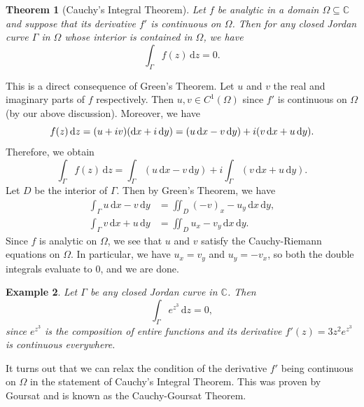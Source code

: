 \documentclass[10pt]{article}
\makeatletter
\newcommand{\C}{\mathbb{C}}
\newcommand{\dd}{\,\mathrm{d}}
\theoremstyle{newstyle}
\newtheorem{thm}{Theorem}[section]
\newtheorem{exmp}[thm]{Example}
\newenvironment{pf}[1][\proofname]{\par
  \pushQED{\qed}%
  \normalfont \topsep0\p@\relax
  \trivlist
  \item[\hskip\labelsep\scshape
  #1\@addpunct{.}]\ignorespaces
}{%
  \popQED\endtrivlist\@endpefalse
}
\makeatother
\begin{document}
\begin{thm}[Cauchy's Integral Theorem]
Let $f$ be analytic in a domain $\Omega \subseteq \C$ and suppose that 
its derivative $f'$ is continuous on $\Omega$. Then for any closed Jordan curve $\Gamma$ 
in $\Omega$ whose interior is contained in $\Omega$, we have 
\[ \int_\Gamma f(z)\dd z = 0. \]
\end{thm}
\begin{pf}
This is a direct consequence of Green's Theorem. Let $u$ and $v$ the real and imaginary parts of 
$f$ respectively. Then $u, v \in C^1(\Omega)$ since $f'$ is continuous on 
$\Omega$ (by our above discussion). Moreover, we have 
\[ f(z)\dd z = (u+iv)({\rm d}x + i\dd y) = (u\dd x - v\dd y) + i(v\dd x + u\dd y). \]
Therefore, we obtain 
\[ \int_\Gamma f(z)\dd z = \int_\Gamma (u\dd x - v\dd y) + i \int_\Gamma (v\dd x + u\dd y). \]
Let $D$ be the interior of $\Gamma$. Then by Green's Theorem, we have 
\begin{align*}
    \int_\Gamma u\dd x - v\dd y &= \iint_D (-v)_x - u_y \dd x \dd y, \\
    \int_\Gamma v\dd x + u\dd y &= \iint_D u_x - v_y \dd x \dd y.
\end{align*}
Since $f$ is analytic on $\Omega$, we see that $u$ and $v$ satisfy the Cauchy-Riemann equations on $\Omega$.
In particular, we have $u_x = v_y$ and $u_y = -v_x$, so both the double 
integrals evaluate to $0$, and we are done. 
\end{pf}

\begin{exmp}
Let $\Gamma$ be any closed Jordan curve in $\C$. Then 
\[ \int_\Gamma e^{z^3} \dd z = 0, \]
since $e^{z^3}$ is the composition of entire functions and its derivative $f'(z) = 3z^2 e^{z^3}$ 
is continuous everywhere. 
\end{exmp}

It turns out that we can relax the condition of the derivative $f'$ being continuous
on $\Omega$ in the statement of Cauchy's Integral Theorem. This was proven by 
Goursat and is known as the Cauchy-Goursat Theorem. 
\end{document}
